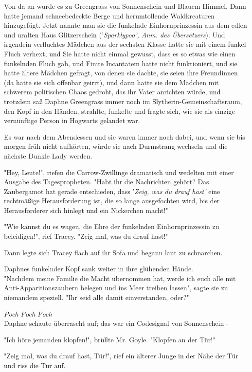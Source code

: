 {Von da an wurde es zu Greengrass von Sonnenschein und Blauem Himmel. Dann hatte jemand schneebedeckte Berge und herumtollende Waldkreaturen hinzugefügt. Jetzt nannte man sie die funkelnde Einhornprinzessin aus dem edlen und uralten Haus Glitzerschein ('\emph{Sparklypoo', Anm. des Übersetzers}). Und irgendein verfluchtes Mädchen aus der sechsten Klasse hatte sie mit einem funkel-Fluch verhext, und Sie hatte nicht einmal gewusst, dass es so etwas wie einen funkelnden Fluch gab, und Finite Incantatem hatte nicht funktioniert, und sie hatte ältere Mädchen gefragt, von denen sie dachte, sie seien ihre Freundinnen (da hatte sie sich offenbar geirrt), und dann hatte sie dem Mädchen mit schwerem politischen Chaos gedroht, das ihr Vater anrichten würde, und trotzdem saß Daphne Greengrass immer noch im Slytherin-Gemeinschaftsraum, den Kopf in den Händen, strahlte, funkelte und fragte sich, wie sie als einzige vernünftige Person in Hogwarts gelandet war.

Es war nach dem Abendessen und sie waren immer noch dabei, und wenn sie bis morgen früh nicht aufhörten, würde sie nach Durmstrang wechseln und die nächste Dunkle Lady werden.

"Hey, Leute!", riefen die Carrow-Zwillinge dramatisch und wedelten mit einer Ausgabe des Tagespropheten. "Habt ihr die Nachrichten gehört? Das Zaubergamot hat gerade entschieden, dass '\emph{Zeig, was du drauf hast'} eine rechtmäßige Herausforderung ist, die so lange ausgefochten wird, bis der Herausforderer sich hinlegt und ein Nickerchen macht!"

"Wie kannst du es wagen, die Ehre der funkelnden Einhornprinzessin zu beleidigen!", rief Tracey. "Zeig mal, was du drauf hast!"

Dann legte sich Tracey flach auf ihr Sofa und begann laut zu schnarchen.

Daphnes funkelnder Kopf sank weiter in ihre glühenden Hände.\\ "Nachdem meine Familie die Macht übernommen hat, werde ich euch alle mit Anti-Apparitionszaubern belegen und ins Meer treiben lassen", sagte sie zu niemandem speziell. "Ihr seid alle damit einverstanden, oder?"

\emph{Poch Poch Poch}\\ Daphne schaute überrascht auf; das war ein Codesignal von Sonnenschein -

"Ich höre jemanden klopfen!", brüllte Mr. Goyle. "Klopfen an der Tür!"

"Zeig mal, was du drauf hast, Tür!", rief ein älterer Junge in der Nähe der Tür und riss die Tür auf.

}
